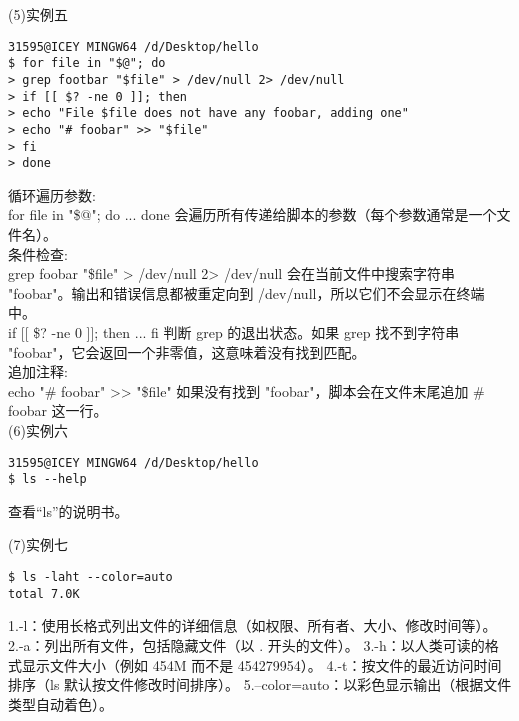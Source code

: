 \documentclass[a4paper, 12pt]{article}
\begin{document}
(5)实例五
\begin{Verbatim}
31595@ICEY MINGW64 /d/Desktop/hello
$ for file in "$@"; do
> grep footbar "$file" > /dev/null 2> /dev/null
> if [[ $? -ne 0 ]]; then
> echo "File $file does not have any foobar, adding one"
> echo "# foobar" >> "$file"
> fi
> done
\end{Verbatim}
{\color{blue}
循环遍历参数:\\
for file in "\$@"; do ... done 会遍历所有传递给脚本的参数（每个参数通常是一个文件名）。\\

条件检查:\\
grep foobar "\$file" > /dev/null 2> /dev/null 会在当前文件中搜索字符串 "foobar"。输出和错误信息都被重定向到 /dev/null，所以它们不会显示在终端中。\\
if [[ \$? -ne 0 ]]; then ... fi 判断 grep 的退出状态。如果 grep 找不到字符串 "foobar"，它会返回一个非零值，这意味着没有找到匹配。\\

追加注释:\\
echo "\# foobar" >> "\$file" 如果没有找到 "foobar"，脚本会在文件末尾追加 \# foobar 这一行。\\
}
(6)实例六
\begin{Verbatim}
31595@ICEY MINGW64 /d/Desktop/hello
$ ls --help
\end{Verbatim}
{\color{blue}
查看“ls”的说明书。}

(7)实例七
\begin{Verbatim}
$ ls -laht --color=auto
total 7.0K
\end{Verbatim}
{\color{blue}
1.-l：使用长格式列出文件的详细信息（如权限、所有者、大小、修改时间等）。
2.-a：列出所有文件，包括隐藏文件（以 . 开头的文件）。
3.-h：以人类可读的格式显示文件大小（例如 454M 而不是 454279954）。
4.-t：按文件的最近访问时间排序（ls 默认按文件修改时间排序）。
5.--color=auto：以彩色显示输出（根据文件类型自动着色）。
}
\end{document}

